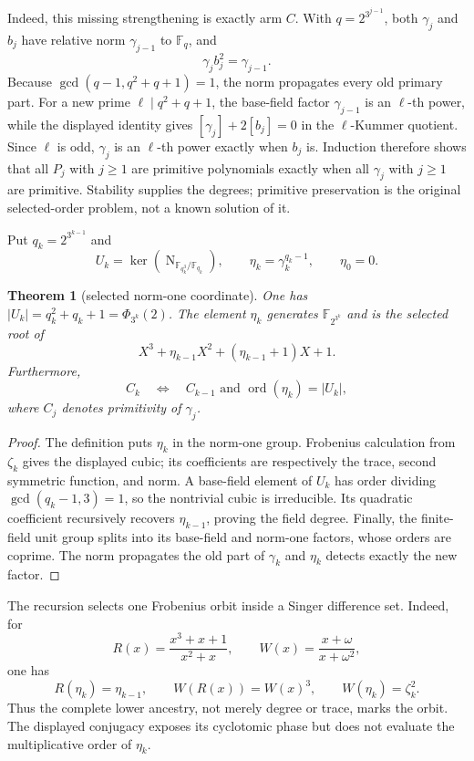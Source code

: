 \documentclass[11pt]{article}
\newtheorem{theorem}{Theorem}[section]
\theoremstyle{definition}
\theoremstyle{remark}
\begin{document}
Indeed, this missing strengthening is exactly arm $C$.  With
$q=2^{3^{j-1}}$, both $\gamma_j$ and $b_j$ have relative norm
$\gamma_{j-1}$ to $\mathbb F_q$, and
\[
 \gamma_j b_j^2=\gamma_{j-1}.
\]
Because $\gcd(q-1,q^2+q+1)=1$, the norm propagates every old primary part.
For a new prime $\ell\mid q^2+q+1$, the base-field factor
$\gamma_{j-1}$ is an $\ell$-th power, while the displayed identity gives
$[\gamma_j]+2[b_j]=0$ in the $\ell$-Kummer quotient.  Since $\ell$ is odd,
$\gamma_j$ is an $\ell$-th power exactly when $b_j$ is.  Induction therefore
shows that all $P_j$ with $j\geq1$ are primitive polynomials exactly when
all $\gamma_j$ with $j\geq1$ are primitive.  Stability supplies the degrees;
primitive preservation is the original selected-order problem, not a known
solution of it.

Put $q_k=2^{3^{k-1}}$ and
\[
 U_k=\ker\!\left(
 \operatorname N_{\mathbb F_{q_k^3}/\mathbb F_{q_k}}
 \right),
 \qquad
 \eta_k=\gamma_k^{q_k-1},
 \qquad \eta_0=0.
\]

\begin{theorem}[selected norm-one coordinate]\label{thm:c-eta}
One has $|U_k|=q_k^2+q_k+1=\Phi_{3^k}(2)$.  The element $\eta_k$ generates
$\mathbb F_{2^{3^k}}$ and is the selected root of
\[
 X^3+\eta_{k-1}X^2+(\eta_{k-1}+1)X+1.
\]
Furthermore,
\[
 C_k\quad\Longleftrightarrow\quad
 C_{k-1}\text{ and }\operatorname{ord}(\eta_k)=|U_k|,
\]
where $C_j$ denotes primitivity of $\gamma_j$.
\end{theorem}

\begin{proof}
The definition puts $\eta_k$ in the norm-one group.  Frobenius calculation
from $\zeta_k$ gives the displayed cubic; its coefficients are respectively
the trace, second symmetric function, and norm.  A base-field element of
$U_k$ has order dividing $\gcd(q_k-1,3)=1$, so the nontrivial cubic is
irreducible.  Its quadratic coefficient recursively recovers
$\eta_{k-1}$, proving the field degree.  Finally, the finite-field unit group
splits into its base-field and norm-one factors, whose orders are coprime.
The norm propagates the old part of $\gamma_k$ and $\eta_k$ detects exactly
the new factor.
\end{proof}

The recursion selects one Frobenius orbit inside a Singer difference set.
Indeed, for
\[
 R(x)=\frac{x^3+x+1}{x^2+x},
 \qquad
 W(x)=\frac{x+\omega}{x+\omega^2},
\]
one has
\[
  R(\eta_k)=\eta_{k-1},
  \qquad W(R(x))=W(x)^3,
  \qquad W(\eta_k)=\zeta_k^2.
\]
Thus the complete lower ancestry, not merely degree or trace, marks the
orbit.  The displayed conjugacy exposes its cyclotomic phase but
does not evaluate the multiplicative order of $\eta_k$.
\end{document}
